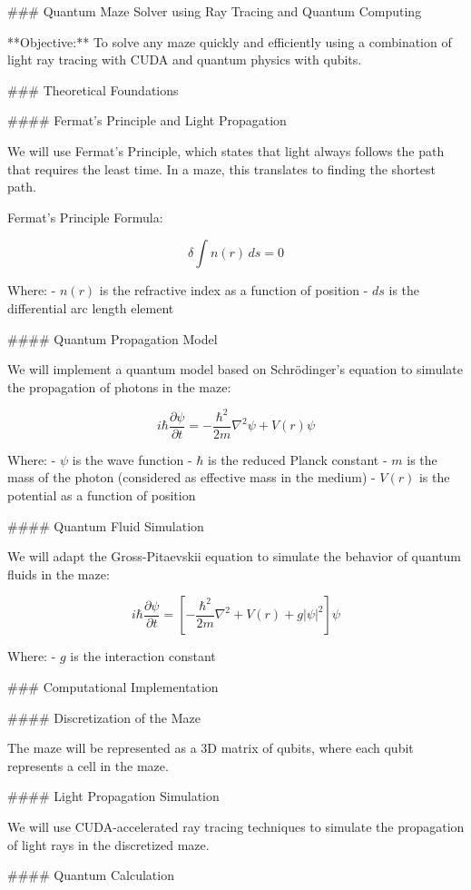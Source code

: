 ### Quantum Maze Solver using Ray Tracing and Quantum Computing

**Objective:** To solve any maze quickly and efficiently using a combination of light ray tracing with CUDA and quantum physics with qubits.

### Theoretical Foundations

#### Fermat's Principle and Light Propagation

We will use Fermat's Principle, which states that light always follows the path that requires the least time. In a maze, this translates to finding the shortest path.

Fermat's Principle Formula:

\[ \delta \int n(r) \, ds = 0 \]

Where:
- \( n(r) \) is the refractive index as a function of position
- \( ds \) is the differential arc length element

#### Quantum Propagation Model

We will implement a quantum model based on Schrödinger's equation to simulate the propagation of photons in the maze:

\[ i\hbar \frac{\partial \psi}{\partial t} = -\frac{\hbar^2}{2m} \nabla^2 \psi + V(r) \psi \]

Where:
- \( \psi \) is the wave function
- \( \hbar \) is the reduced Planck constant
- \( m \) is the mass of the photon (considered as effective mass in the medium)
- \( V(r) \) is the potential as a function of position

#### Quantum Fluid Simulation

We will adapt the Gross-Pitaevskii equation to simulate the behavior of quantum fluids in the maze:

\[ i\hbar \frac{\partial \psi}{\partial t} = \left[-\frac{\hbar^2}{2m} \nabla^2 + V(r) + g|\psi|^2 \right]\psi \]

Where:
- \( g \) is the interaction constant

### Computational Implementation

#### Discretization of the Maze

The maze will be represented as a 3D matrix of qubits, where each qubit represents a cell in the maze.

#### Light Propagation Simulation

We will use CUDA-accelerated ray tracing techniques to simulate the propagation of light rays in the discretized maze.

#### Quantum Calculation

